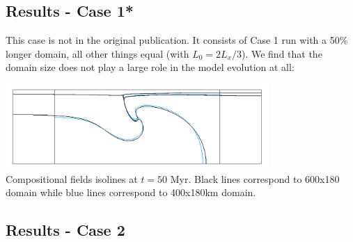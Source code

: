 \subsection*{Results - Case 1* }

This case is not in the original publication. It consists of Case 1 run with a 
50\% longer domain, all other things equal (with $L_0=2L_x/3$). We find that the domain size does not
play a large role in the model evolution at all: 

\begin{center}
\includegraphics[width=10cm]{python_codes/fieldstone_118/results/case1b/isos}\\
{\captionfont Compositional fields isolines at $t=50$ Myr. Black lines correspond
to 600x180 domain while blue lines correspond to 400x180km domain.}
\end{center}

\subsection*{Results - Case 2}

